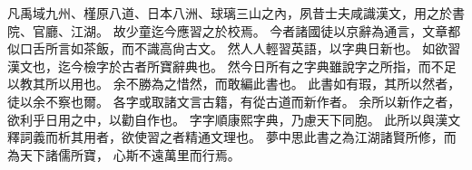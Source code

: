 凡禹域九州、槿原八道、日本八洲、球璃三山之內，夙昔士夫咸識漢文，用之於書院、官廳、江湖。
故少童迄今應習之於校焉。
今者諸國徒以京辭為通言，文章都似口舌所言如茶飯，而不識高尙古文。
然人人輕習英語，以字典日新也。
如欲習漢文也，迄今檢字於古者所寶辭典也。
然今日所有之字典雖說字之所指，而不足以教其所以用也。
余不勝為之惜然，而敢編此書也。
此書如有瑕，其所以然者，徒以余不察也爾。
各字或取諸文言古籍，有從古道而新作者。
余所以新作之者，欲利乎日用之中，以勸自作也。
字字順康熙字典，乃慮天下同胞。
此所以與漢文釋詞義而析其用者，欲使習之者精通文理也。
夢中思此書之為江湖諸賢所修，而為天下諸儒所寶，
心斯不遠萬里而行焉。
